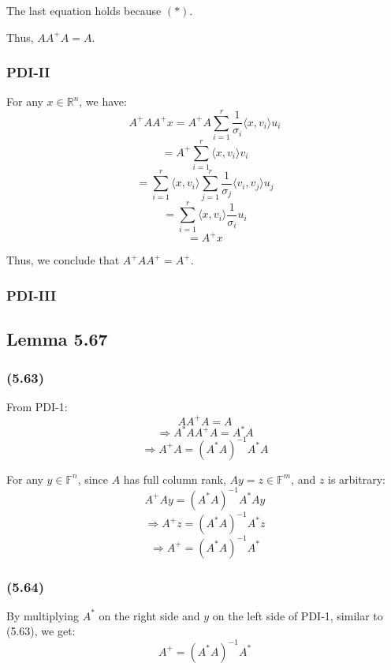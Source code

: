 \documentclass[a4paper]{article}
\begin{document}
The last equation holds because \( (*) \).

Thus, \( AA^+ A = A \).

\subsubsection*{PDI-II}
For any \( x \in \mathbb{R}^n \), we have:
\[
A^+ A A^+ x = A^+ A \sum_{i=1}^{r} \frac{1}{\sigma_i} \langle x, v_i \rangle u_i
\]
\[
= A^+ \sum_{i=1}^{r} \langle x, v_i \rangle v_i
\]
\[
= \sum_{i=1}^{r} \langle x, v_i \rangle \sum_{j=1}^{r} \frac{1}{\sigma_j} \langle v_i, v_j \rangle u_j
\]
\[
= \sum_{i=1}^{r} \langle x, v_i \rangle \frac{1}{\sigma_i} u_i
\]
\[
= A^+ x
\]

Thus, we conclude that \( A^+ A A^+ = A^+ \).

\subsubsection*{PDI-III}

\subsection*{Lemma 5.67}
\subsubsection*{(5.63)}
From PDI-1:
\[
A A^+ A = A
\]
\[
\Rightarrow A^* A A^+ A = A^* A
\]
\[
\Rightarrow A^+ A = (A^* A)^{-1} A^* A
\]

For any \( y \in \mathbb{F}^n \), since \( A \) has full column rank, \( Ay = z \in \mathbb{F}^m \), and $z$ is arbitrary:
\[
A^+ A y = (A^* A)^{-1} A^* A y
\]
\[
\Rightarrow A^+ z = (A^* A)^{-1} A^* z
\]
\[
\Rightarrow A^+ = (A^* A)^{-1} A^*
\]


\subsubsection*{(5.64)}
By multiplying \( A^* \) on the right side and \( y \) on the left side of PDI-1, similar to (5.63), we get:
\[
A^+ = (A^* A)^{-1} A^*
\]

\printbibliography
\end{document}
